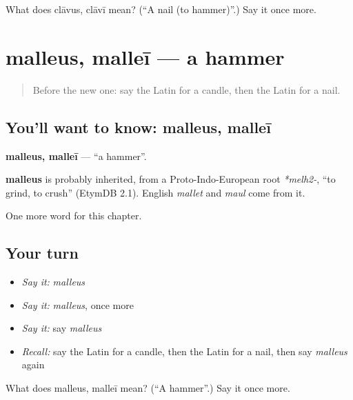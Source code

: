 \begin{tcolorbox}[breakable,colback=teal!4,colframe=teal!35!black,title={Before you move on}]
What does clāvus, clāvī mean? (\textquotedblleft{}A nail (to hammer)\textquotedblright{}.) Say it once more.
\end{tcolorbox}
\section[malleus, malleī]{malleus, malleī — a hammer}

\label{lesson:LA-C122-malleus}



\begin{quote}
Before the new one: say the Latin for a candle, then the Latin for a nail.
\end{quote}

\subsection*{You'll want to know: malleus, malleī}
\textbf{malleus, malleī} — \textquotedblleft{}a hammer\textquotedblright{}.

\begin{cousinweb}
\textbf{malleus} is probably inherited, from a Proto-Indo-European root \emph{*melh2-}, \textquotedblleft{}to grind, to crush\textquotedblright{} (EtymDB 2.1). English \emph{mallet} and \emph{maul} come from it.
\end{cousinweb}

\begin{grammarlens}[title={What you've built}]
One more word for this chapter.
\end{grammarlens}

\subsection*{Your turn}
\begin{itemize}
\raggedright
  \item \emph{Say it:} \emph{malleus}
  \item \emph{Say it:} \emph{malleus}, once more
  \item \emph{Say it:} say \emph{malleus}
  \item \emph{Recall:} say the Latin for a candle, then the Latin for a nail, then say \emph{malleus} again
\end{itemize}

\begin{tcolorbox}[breakable,colback=teal!4,colframe=teal!35!black,title={Before you move on}]
What does malleus, malleī mean? (\textquotedblleft{}A hammer\textquotedblright{}.) Say it once more.
\end{tcolorbox}
